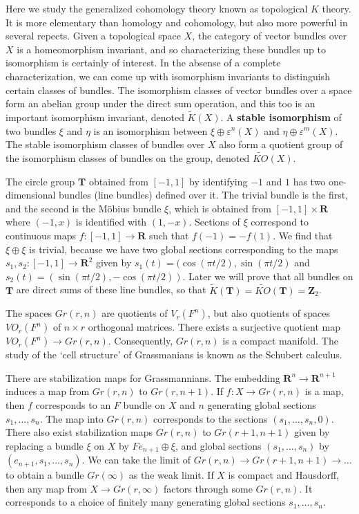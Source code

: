 Here we study the generalized cohomology theory known as topological $K$ theory. It is more elementary than homology and cohomology, but also more powerful in several repects. Given a topological space $X$, the category of vector bundles over $X$ is a homeomorphism invariant, and so characterizing these bundles up to isomorphism is certainly of interest. In the absense of a complete characterization, we can come up with isomorphism invariants to distinguish certain classes of bundles. The isomorphism classes of vector bundles over a space form an abelian group under the direct sum operation, and this too is an important isomorphism invariant, denoted $\widetilde{K}(X)$. A {\bf stable isomorphism} of two bundles $\xi$ and $\eta$ is an isomorphism between $\xi \oplus \varepsilon^n(X)$ and $\eta \oplus \varepsilon^m(X)$. The stable isomorphism classes of bundles over $X$ also form a quotient group of the isomorphism classes of bundles on the group, denoted $\widetilde{KO}(X)$.

\begin{example}
    The circle group $\mathbf{T}$ obtained from $[-1,1]$ by identifying $-1$ and $1$ has two one-dimensional bundles (line bundles) defined over it. The trivial bundle is the first, and the second is the M\"{o}bius bundle $\xi$, which is obtained from $[-1,1] \times \mathbf{R}$ where $(-1,x)$ is identified with $(1,-x)$. Sections of $\xi$ correspond to continuous maps $f: [-1,1] \to \mathbf{R}$ such that $f(-1) = -f(1)$. We find that $\xi \oplus \xi$ is trivial, because we have two global sections corresponding to the maps $s_1, s_2: [-1,1] \to \mathbf{R}^2$ given by $s_1(t) = (\cos (\pi t/2), \sin(\pi t/2)$ and $s_2(t) = (\sin (\pi t/2),- \cos (\pi t/2))$.
    Later we will prove that all bundles on $\mathbf{T}$ are direct sums of these line bundles, so that $\widetilde{K}(\mathbf{T}) = \widetilde{KO}(\mathbf{T}) = \mathbf{Z}_2$.
\end{example}

The spaces $Gr(r,n)$ are quotients of $V_r(F^n)$, but also quotients of spaces $VO_r(F^n)$ of $n \times r$ orthogonal matrices. There exists a surjective quotient map $VO_r(F^n) \to Gr(r,n)$. Consequently, $Gr(r,n)$ is a compact manifold. The study of the `cell structure' of Grassmanians is known as the Schubert calculus.

There are stabilization maps for Grassmannians. The embedding $\mathbf{R}^n \to \mathbf{R}^{n+1}$ induces a map from $Gr(r,n)$ to $Gr(r,n+1)$. If $f: X \to Gr(r,n)$ is a map, then $f$ corresponds to an $F$ bundle on $X$ and $n$ generating global sections $s_1, \dots, s_n$. The map into $Gr(r,n)$ corresponds to the sections $(s_1, \dots, s_n, 0)$. There also exist stabilization maps $Gr(r,n)$ to $Gr(r+1,n+1)$ given by replacing a bundle $\xi$ on $X$ by $Fe_{n+1} \oplus \xi$, and global sections $(s_1, \dots, s_n)$ by $(e_{n+1}, s_1, \dots, s_n)$. We can take the limit of $Gr(r,n) \to Gr(r+1,n+1) \to \dots$ to obtain a bundle $Gr(\infty)$ as the weak limit. If $X$ is compact and Hausdorff, then any map from $X \to Gr(r,\infty)$ factors through some $Gr(r,n)$. It corresponds to a choice of finitely many generating global sections $s_1, \dots, s_n$.

